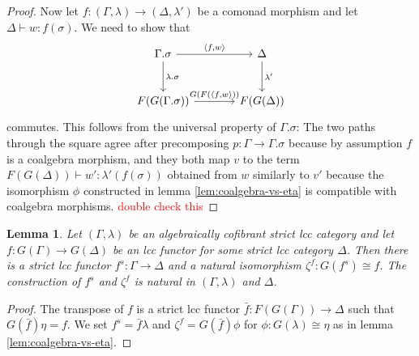 \documentclass{article}
\newcommand{\todo}[1]{\textcolor{red}{#1}}
\newtheorem{lemma}{Lemma}
\theoremstyle{remark}
\theoremstyle{definition}
\begin{document}
\begin{proof}
  Now let $f : (\Gamma, \lambda) \rightarrow (\Delta, \lambda')$ be a comonad morphism and let $\Delta \vdash w : f(\sigma)$.
  We need to show that
  \begin{equation}
    \begin{tikzcd}[column sep=large, row sep=large]
      \Gamma.\sigma \arrow[r, "{\langle f, w \rangle}"] \arrow[d, "\lambda.\sigma"] & \Delta \arrow[d, "\lambda'"] \\
      F(G(\Gamma.\sigma)) \arrow[r, "{G(F(\langle f, w \rangle}))"] & F(G(\Delta))
    \end{tikzcd}
  \end{equation}
  commutes.
  This follows from the universal property of $\Gamma.\sigma$:
  The two paths through the square agree after precomposing $p : \Gamma \rightarrow \Gamma.\sigma$ because by assumption $f$ is a coalgebra morphism, and they both map $v$ to the term $F(G(\Delta)) \vdash w' : \lambda'(f(\sigma))$ obtained from $w$ similarly to $v'$ because the isomorphism $\phi$ constructed in lemma \ref{lem:coalgebra-vs-eta} is compatible with coalgebra morphisms.
  \todo{double check this}
\end{proof}

\begin{lemma}
  \label{lem:strictification}
  Let $(\Gamma, \lambda)$ be an algebraically cofibrant strict lcc category and let $f : G(\Gamma) \rightarrow G(\Delta)$ be an lcc functor for some strict lcc category $\Delta$.
  Then there is a strict lcc functor $f^s : \Gamma \rightarrow \Delta$ and a natural isomorphism $\zeta^f : G(f^s) \cong f$.
  The construction of $f^s$ and $\zeta^f$ is natural in $(\Gamma, \lambda)$ and $\Delta$.
\end{lemma}
\begin{proof}
  The transpose of $f$ is a strict lcc functor $\bar f : F(G(\Gamma)) \rightarrow \Delta$ such that $G(\bar f) \eta = f$.
  We set $f^s = \bar f \lambda$ and $\zeta^f = G(\bar f) \phi$ for $\phi : G(\lambda) \cong \eta$ as in lemma \ref{lem:coalgebra-vs-eta}.
\end{proof}
\end{document}
